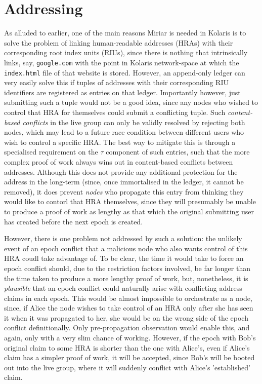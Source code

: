 \documentclass{extreport}
\begin{document}
\chapter{Addressing}
\label{sec:org9928c7d}

As alluded to earlier, one of the main reasons Miriar is needed in Kolaris is to solve the problem of linking human-readable addresses (HRAs) with their corresponding root index units (RIUs), since there is nothing that intrinsically links, say, \texttt{google.com} with the point in Kolaris network-space at which the \texttt{index.html} file of that website is stored. However, an append-only ledger can very easily solve this if tuples of addresses with their corresponding RIU identifiers are registered as entries on that ledger. Importantly however, just submitting such a tuple would not be a good idea, since any nodes who wished to control that HRA for themselves could submit a conflicting tuple. Such \emph{content-based conflicts} in the live group can only be validly resolved by rejecting both nodes, which may lead to a future race condition between different users who wish to control a specific HRA. The best way to mitigate this is through a specialised requirement on the \(\tau\) component of such entries, such that the more complex proof of work always wins out in content-based conflicts between addresses. Although this does not provide any additional protection for the address in the long-term (since, once immortalised in the ledger, it cannot be removed), it does prevent \emph{nodes} who propagate this entry from thinking they would like to contorl that HRA themselves, since they will presumably be unable to produce a proof of work as lengthy as that which the original submitting user has created before the next epoch is created.

However, there is one problem not addressed by such a solution: the unlikely event of an epoch conflict that a malicious node who also wants control of this HRA coudl take advantage of. To be clear, the time it would take to force an epoch conflict should, due to the restriction factors involved, be far longer than the time taken to produce a more lengthy proof of work, but, nonetheless, it is \emph{plausible} that an epoch conflict could naturally arise with conflicting address claims in each epoch. This would be almost impossible to orchestrate as a node, since, if Alice the node wishes to take control of an HRA only after she has seen it when it was propagated to her, she would be on the wrong side of the epoch conflict definitionally. Only pre-propagation observation would enable this, and again, only with a very slim chance of working. However, if the epoch with Bob's original claim to some HRA is shorter than the one with Alice's, even if Alice's claim has a simpler proof of work, it will be accepted, since Bob's will be booted out into the live group, where it will suddenly conflict with Alice's 'established' claim.
\end{document}
